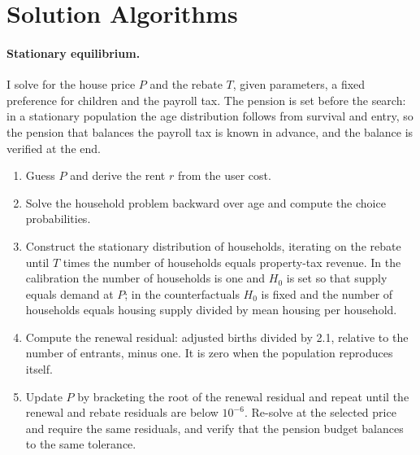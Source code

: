 



\section{Solution Algorithms}
\label{app:algorithms}

\paragraph{Stationary equilibrium.} I solve for the house price $P$ and the
rebate $T$, given parameters, a fixed preference for children and the payroll
tax. The pension is set before the search: in a stationary population the
age distribution follows from survival and entry, so the pension that
balances the payroll tax is known in advance, and the balance is verified at
the end.
\begin{enumerate}
\item Guess $P$ and derive the rent $r$ from the user cost.
\item Solve the household problem backward over age and compute the choice
probabilities.
\item Construct the stationary distribution of households, iterating on the
rebate until $T$ times the number of households equals property-tax revenue.
In the calibration the number of households is one and $H_0$ is set so that
supply equals demand at $P$; in the counterfactuals $H_0$ is fixed and the
number of households equals housing supply divided by mean housing per
household.
\item Compute the renewal residual: adjusted births divided by 2.1, relative to the
number of entrants, minus one. It is zero when the population reproduces
itself.
\item Update $P$ by bracketing the root of the renewal residual and repeat
until the renewal and rebate residuals are below $10^{-6}$. Re-solve at the
selected price and require the same residuals, and verify that the pension
budget balances to the same tolerance.
\end{enumerate}

